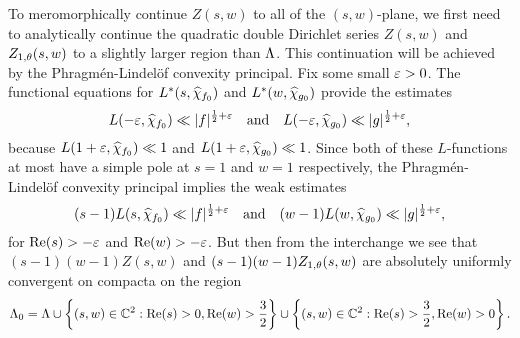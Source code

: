 \documentclass[12pt,reqno,oneside]{amsart}
\begin{document}
     To meromorphically continue $Z(s,w)$ to all of the $(s,w)$-plane, we first need to analytically continue the quadratic double Dirichlet series $Z(s,w)$ and $Z_{1,\theta}(s,w)$ to a slightly larger region than $\Lambda$. This continuation will be achieved by the Phragm\'en-Lindel\"of convexity principal. Fix some small $\varepsilon > 0$. The functional equations for $L^{\ast}(s,\widehat{\chi}_{f_{0}})$ and $L^{\ast}(w,\widehat{\chi}_{g_{0}})$ provide the estimates
    \[
        L(-\varepsilon,\widehat{\chi}_{f_{0}}) \ll |f|^{\frac{1}{2}+\varepsilon} \quad \text{and} \quad L(-\varepsilon,\widehat{\chi}_{g_{0}}) \ll |g|^{\frac{1}{2}+\varepsilon},
    \]
    because $L(1+\varepsilon,\widehat{\chi}_{f_{0}}) \ll 1$ and $L(1+\varepsilon,\widehat{\chi}_{g_{0}}) \ll 1$. Since both of these $L$-functions at most have a simple pole at $s = 1$ and $w = 1$ respectively, the Phragm\'en-Lindel\"of convexity principal implies the weak estimates
    \[
        (s-1)L(s,\widehat{\chi}_{f_{0}}) \ll |f|^{\frac{1}{2}+\varepsilon} \quad \text{and} \quad (w-1)L(w,\widehat{\chi}_{g_{0}}) \ll |g|^{\frac{1}{2}+\varepsilon},
    \]
    for $\mathrm{Re}(s) > -\varepsilon$ and $\mathrm{Re}(w) > -\varepsilon$. But then from the interchange we see that $(s-1)(w-1)Z(s,w)$ and $(s-1)(w-1)Z_{1,\theta}(s,w)$ are absolutely uniformly convergent on compacta on the region
    \[
        \Lambda_{0} = \Lambda \cup \left\{(s,w) \in \mathbb{C}^{2}:\mathrm{Re}(s) > 0, \mathrm{Re}(w) > \frac{3}{2}\right\} \cup \left\{(s,w) \in \mathbb{C}^{2}:\mathrm{Re}(s) > \frac{3}{2}, \mathrm{Re}(w) > 0\right\}.
    \]
    
    \begin{center}
    \end{center}
    
\end{document}
